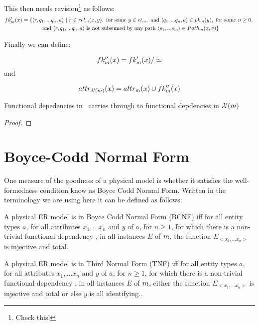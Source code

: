 This then needs revision\footnote{Check this!} as follows:
\begin{multline}
\fkp{x} = \setsuchthat{\tuple{r,q_1,...q_n,a}}
                      {r \in \rel{x}{y},
                                  \text{ for some } y \in \et,
																	\text{ and } \tuple{q_1,...q_n,a} \in \pk{y},
																	\text{ for some } n \geq 0,                   \right. \\        
											\left.		\text{ and } \tuple{r, q_1,...q_n,a}
																	\text{ is not subsumed by any path }
																	      \tuple{s_1,...s_m} \in \path{x}{v}
											}			                   
\end{multline}

Finally we can define:

\begin{equation}
\fkpp{x} = \fkp{x}/\simeq
\end{equation}
and 

\begin{equation}
\attr[\chiM]{x}  = \attr{x}  \cup  \fkpp{x}
\end{equation}


\begin{lemma}
\label{fdcarrythroughlemma}
Functional depedencies in \genericmodel\ carries through to functional depdencies in $\genericphysical$ 
\end{lemma}
\begin{proof}

\end{proof}

\section{Boyce-Codd Normal Form}
\noindent One measure of the goodness of a physical model is whether it satisfies the well-formedness condition know as Boyce Codd Normal Form.
Written in the terminology we are using here it can be defined as follows:
\begin{definition} %
A physical ER model is in Boyce Codd Normal Form (BCNF)  iff
for all entity types $a$, for all attributes $x_1,...x_n$ and $y$ of $a$, for $n \geq 1$, 
for which  there is a non-trivial functional dependency , 
in all instances $E$  of $\genericmodel$, the function $E_{<x_1,...x_n>}$ is injective and total.  
\end{definition}

\begin{definition} %
A physical ER model is in Third Normal Form (TNF)  iff
for all entity types $a$, for all attributes $x_1,...x_n$ and $y$ of $a$, for $n \geq 1$, 
for which  there is a non-trivial functional dependency , 
in all instances $E$  of $\genericmodel$, either the function $E_{<x_1,...x_n>}$ is injective and total
or else $y$ is all identifying..  
\end{definition}

